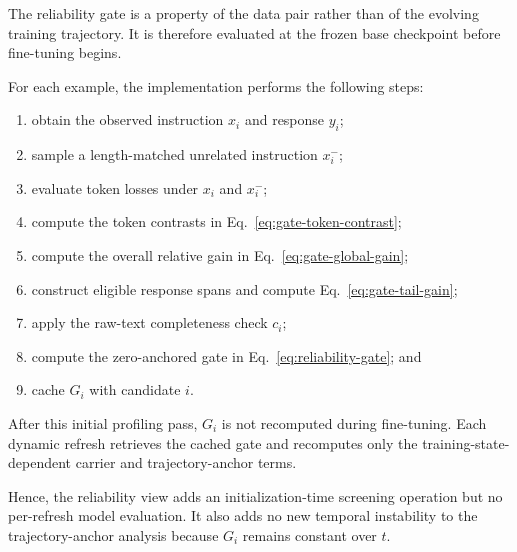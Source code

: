 The reliability gate is a property of the data pair rather than of
the evolving training trajectory. It is therefore evaluated at the
frozen base checkpoint before fine-tuning begins.

For each example, the implementation performs the following steps:
\begin{enumerate}
    \item obtain the observed instruction \(x_i\) and response \(y_i\);
    \item sample a length-matched unrelated instruction \(x_i^{-}\);
    \item evaluate token losses under \(x_i\) and \(x_i^{-}\);
    \item compute the token contrasts in
          Eq.~\eqref{eq:gate-token-contrast};
    \item compute the overall relative gain in
          Eq.~\eqref{eq:gate-global-gain};
    \item construct eligible response spans and compute
          Eq.~\eqref{eq:gate-tail-gain};
    \item apply the raw-text completeness check \(c_i\);
    \item compute the zero-anchored gate in
          Eq.~\eqref{eq:reliability-gate}; and
    \item cache \(G_i\) with candidate \(i\).
\end{enumerate}

After this initial profiling pass, \(G_i\) is not recomputed during
fine-tuning. Each dynamic refresh retrieves the cached gate and
recomputes only the training-state-dependent carrier and
trajectory-anchor terms.

Hence, the reliability view adds an initialization-time screening
operation but no per-refresh model evaluation. It also adds no new
temporal instability to the trajectory-anchor analysis because
\(G_i\) remains constant over \(t\).



